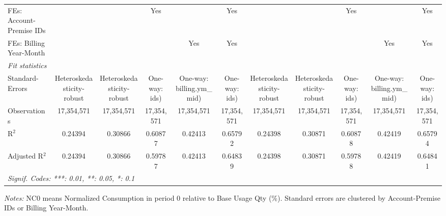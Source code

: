 \begin{table}[htbp]
\begin{tabular}{lcccccccccc}
FEs: Account-Premise IDs &  &  & Yes &  & Yes &  &  & Yes &  & Yes\\
FEs: Billing Year-Month &  &  &  & Yes & Yes &  &  &  & Yes & Yes\\
\midrule
\emph{Fit statistics}&  & & & & & & & & & \\
Standard-Errors& Heteroskedasticity-robust&Heteroskedasticity-robust&One-way: ids)&One-way: billing.ym\_mid)&One-way: ids)&Heteroskedasticity-robust&Heteroskedasticity-robust&One-way: ids)&One-way: billing.ym\_mid)&One-way: ids)\\
Observations & 17,354,571&17,354,571&17,354,571&17,354,571&17,354,571&17,354,571&17,354,571&17,354,571&17,354,571&17,354,571\\
R$^2$ & 0.24394&0.30866&0.60877&0.42413&0.65792&0.24398&0.30871&0.60878&0.42419&0.65794\\
Adjusted R$^2$ & 0.24394&0.30866&0.59787&0.42413&0.64839&0.24398&0.30871&0.59788&0.42419&0.64841\\
\bottomrule\bottomrule
\multicolumn{11}{l}{\emph{Signif. Codes: ***: 0.01, **: 0.05, *: 0.1}}\\
\end{tabular}

\emph{\medskip Notes:} NC0 means Normalized Consumption in period 0 relative to Base Usage Qty (\%). Standard errors are clustered by Account-Premise IDs or Billing Year-Month.
\end{table}